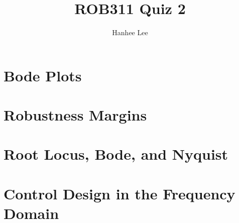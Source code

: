 \documentclass{article}
\title{ROB311 Quiz 2}
\author{Hanhee Lee}
\begin{document}
\maketitle

\tableofcontents
\newpage

\section{Bode Plots}

\newpage

\section{Robustness Margins}

\newpage

\section{Root Locus, Bode, and Nyquist}


\section{Control Design in the Frequency Domain}



\newpage
\end{document}
